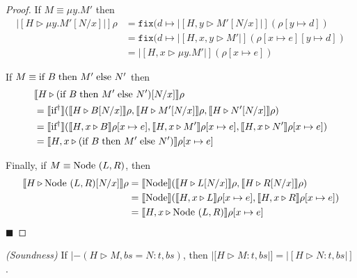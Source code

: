 \begin{proof}
If $M\equiv \mu y.M'$ then
\begin{align*}
|[H\triangleright \mu y.M'[N/x]|]\rho &= 
\texttt{fix}(d\mapsto |[H,y\triangleright M'[N/x]|]
(\rho[y\mapsto d]) \\
&= \texttt{fix}(d\mapsto |[H,x,y\triangleright M'|]
(\rho[x\mapsto e][y\mapsto d]) \\
&= |[H,x\triangleright \mu y.M'|](\rho[x\mapsto e])
\end{align*}

If $M\equiv \textrm{if } B \;\textrm{then } M' \;\textrm{else } N'$ then
\begin{align*}
& |[H\triangleright (\textrm{if } B \;\textrm{then } M' \;\textrm{else } N')[N/x]|]\rho \\
&= 
|[\textrm{if }\!\!^{\dagger}|](|[H\triangleright B[N/x]|]\rho, |[H\triangleright M'[N/x]|]\rho, |[H\triangleright N'[N/x]|]\rho) \\
&= |[\textrm{if }\!\!^{\dagger}|](|[H,x\triangleright B|]\rho[x\mapsto e], |[H,x\triangleright M'|]\rho[x\mapsto e], |[H,x\triangleright N'|]\rho[x\mapsto e]) \\
&= |[H,x\triangleright (\textrm{if } B \;\textrm{then } M' \;\textrm{else } N')|]\rho[x\mapsto e]
\end{align*}

Finally, if $M\equiv \textrm{Node }(L,R)$, then
\begin{align*}
|[H\triangleright \textrm{Node }(L,R)[N/x]|]\rho &= 
|[\textrm{Node }\!\!|](|[H\triangleright L[N/x]|]\rho, |[H\triangleright R[N/x]|]\rho) \\
&= |[\textrm{Node }\!\!|](|[H,x\triangleright L|]\rho[x\mapsto e], |[H,x\triangleright R|]\rho[x\mapsto e]) \\
&= |[H,x\triangleright \textrm{Node }(L,R)|]\rho[x\mapsto e]
\end{align*}
\hfill $\blacksquare$
\end{proof}

\begin{theorem}
\emph{(Soundness)} If $|-(H\triangleright M,bs=N:t, bs)$, 
then $|[H\triangleright M:t, bs|] = |[H\triangleright N:t, bs|]$.
\end{theorem}

